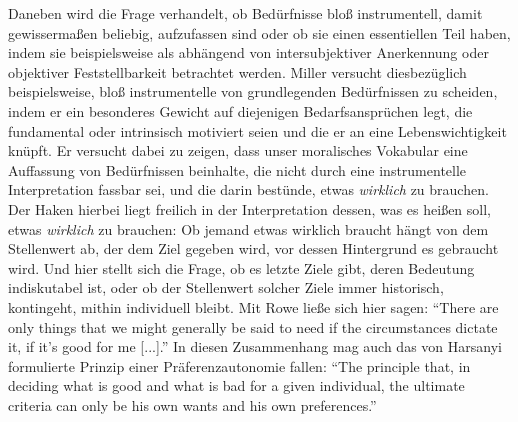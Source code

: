 \documentclass[a4paper]{thesis}
\begin{document}
Daneben wird die Frage verhandelt, ob Bedürfnisse bloß instrumentell, damit gewissermaßen beliebig, aufzufassen sind oder ob sie einen essentiellen Teil haben, indem sie beispielsweise als abhängend von intersubjektiver Anerkennung oder objektiver Feststellbarkeit betrachtet werden. Miller versucht diesbezüglich beispielsweise, bloß instrumentelle von grundlegenden Bedürfnissen zu scheiden, indem er ein besonderes Gewicht auf diejenigen Bedarfsansprüchen legt, die fundamental oder intrinsisch motiviert seien und die er an eine Lebenswichtigkeit knüpft. Er versucht dabei zu zeigen, dass unser moralisches Vokabular eine Auffassung von Bedürfnissen beinhalte, die nicht durch eine instrumentelle Interpretation fassbar sei, und die darin bestünde, etwas \textit{wirklich} zu brauchen. Der Haken hierbei liegt freilich in der Interpretation dessen, was es heißen soll, etwas \textit{wirklich} zu brauchen: Ob jemand etwas wirklich braucht hängt von dem Stellenwert ab, der dem Ziel gegeben wird, vor dessen Hintergrund es gebraucht wird. Und hier stellt sich die Frage, ob es letzte Ziele gibt, deren Bedeutung indiskutabel ist, oder ob der Stellenwert solcher Ziele immer historisch, kontingeht, mithin individuell bleibt. Mit Rowe ließe sich hier sagen: \enquote{There are only things that we might generally be said to need if the circumstances dictate it, if it's good for me [...].} In diesen Zusammenhang mag auch das von Harsanyi formulierte Prinzip einer Präferenzautonomie fallen: \enquote{The principle that, in deciding what is good and what is bad for a given individual, the ultimate criteria can only be his own wants and his own preferences.}
\end{document}
